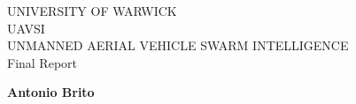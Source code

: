 \documentclass{article}
\begin{document}
\begin{titlepage}
   \begin{center}
        \large UNIVERSITY OF WARWICK\\
       \vspace*{8cm}
        \Huge UAVSI
        \\
        \vspace{0.5cm}
        \normalsize UNMANNED AERIAL VEHICLE SWARM INTELLIGENCE
        \\
        \vspace{0.2cm}
        Final Report
            
       \vspace{5cm}

       \large \textbf{Antonio Brito}
			
			\smallskip

       \vfill

   \end{center}
\end{titlepage}




\newpage
% 
\end{document}
